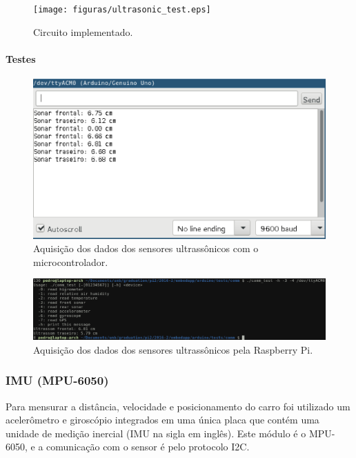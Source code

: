 	\begin{figure}[!htbp]
		\begin{center}
			\texttt{[image: figuras/ultrasonic\_test.eps]}
			\caption{\label{hcsr04test}Circuito implementado.}
		\end{center}
	\end{figure}

	\paragraph{Testes}

	\begin{figure}[!htbp]
	\begin{center}
	\includegraphics[width=.7\textwidth]{figuras/hcsr04_arduino.eps}
	\caption{\label{fig:hcsr04ardu}Aquisição dos dados dos sensores ultrassônicos com o microcontrolador.}
	\end{center}
	\end{figure}

	\begin{figure}[!htbp]
	\begin{center}
	\includegraphics[width=\textwidth]{figuras/hcsr04_raspberry.eps}
	\caption{\label{fig:hcsr04rasp}Aquisição dos dados dos sensores ultrassônicos pela Raspberry Pi.}
	\end{center}
	\end{figure}

	\subsubsection{IMU (MPU-6050)}

	Para mensurar a distância, velocidade e posicionamento do carro
	foi utilizado um acelerômetro e giroscópio integrados em uma
	única placa que contém uma unidade de medição inercial (IMU na
	sigla em inglês). Este módulo é o MPU-6050, e a comunicação
	com o sensor é pelo protocolo I2C.

